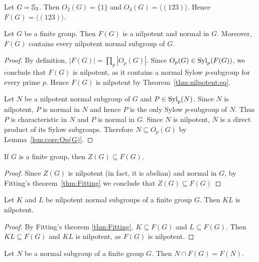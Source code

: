 \begin{example}
Let $G=\mathbb{S}_3$. Then $O_2(G)=\{1\}$ and $O_3(G)=\langle
(123)\rangle$. Hence $F(G)=\langle (123)\rangle$.
\end{example}

\begin{theorem}[Fitting]
\label{thm:Fitting}
Let $G$ be a finite group. Then $F(G)$ is a nilpotent and normal in $G$.
Moreover, $F(G)$ contains every nilpotent normal subgroup of $G$.
\end{theorem}

\begin{proof}
By definition, $|F(G)|=\prod_p|O_p(G)|$.
Since $O_p(G)\in\mathrm{Syl}_p(F(G))$, we conclude that $F(G)$ is nilpotent, as it contains 
a normal Sylow $p$-subgroup for every prime $p$. 
Hence $F(G)$ is nilpotent by Theorem~\ref{thm:nilpotent:eq}.

Let $N$ be a nilpotent normal subgroup of $G$ and $P\in\mathrm{Syl}_p(N)$. Since 
$N$ is nilpotent, $P$ is normal in $N$ and hence $P$ is the only 
Sylow $p$-subgroup of $N$. Thus $P$ is characteristic in $N$ and 
$P$ is normal in $G$. Since $N$ is nilpotent, $N$ is a direct product of its Sylow subgroups. 
Therefore $N\subseteq O_p(G)$ by Lemma~\ref{lem:core:Op(G)}.
\end{proof}

\begin{corollary}
\label{cor:Z(G)subsetF(G)}
If $G$ is a finite group, then $Z(G)\subseteq F(G)$.
\end{corollary}

\begin{proof}
Since $Z(G)$ is nilpotent (in fact, it is abelian) and 
normal in $G$, by Fitting's theorem~\ref{thm:Fitting} we conclude that 
$Z(G)\subseteq F(G)$ 
\end{proof}

\begin{corollary}[Fitting]
\label{cor:Fitting}
Let $K$ and $L$ be nilpotent normal subgroups of a finite group $G$. 
Then $KL$ is nilpotent. 
\end{corollary}

\begin{proof}
By Fitting's theorem \ref{thm:Fitting}, $K\subseteq F(G)$ and 
$L\subseteq F(G)$. Then $KL\subseteq F(G)$ and $KL$ is nilpotent, as 
$F(G)$ is nilpotent. 
\end{proof}

\begin{corollary}
\label{cor:McapF(G)}
Let $N$ be a normal subgroup of a finite group $G$. Then 
$N\cap F(G)=F(N)$.
\end{corollary}

